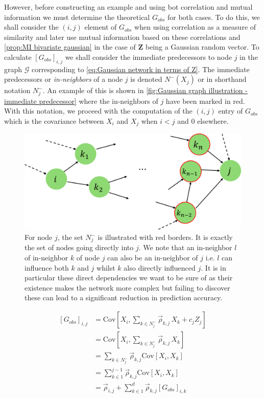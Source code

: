 \documentclass[../Thesis.tex]{subfiles}
\begin{document}
However, before constructing an example and using bot correlation and mutual information we must determine the theoretical $G_{obs}$ for both cases. To do this, we shall consider the $(i,j)$ element of $G_{obs}$ when using correlation as a measure of similarity and later use mutual information based on these correlations and \autoref{prop:MI bivariate gaussian} in the case of $\boldsymbol Z$ being a Gaussian random vector. To calculate $\left[G_{obs}\right]_{i,j}$ we shall consider the immediate predecessors to node $j$ in the graph $\mathcal{G}$ corresponding to \autoref{eq:Gaussian network in terms of Z}. The immediate predecessors or \textit{in-neighbors} of a node $j$ is denoted $N^-\left(X_j\right)$ or in shorthand notation $N^-_j$. An example of this is shown in \autoref{fig:Gaussian graph illustration - immediate predecessor} where the in-neighbors of $j$ have been marked in red. With this notation, we proceed with the computation of the $(i,j)$ entry of $G_{obs}$ which is the covariance between $X_i$ and $X_j$ when $i < j$ and $0$ elsewhere.
\begin{figure}[H]
    \centering
    \includegraphics[width = .7\linewidth]{figures/ND examples/Gaussian graph illustration - immediate predecessor.png}
    \caption{For node $j$, the set $N^-_j$ is illustrated with red borders. It is exactly the set of nodes going directly into $j$. We note that an in-neighbor $l$ of in-neighbor $k$ of node $j$ can also be an in-neighbor of $j$ i.e. $l$ can influence both $k$ and $j$ whilst $k$ also directly influenced $j$. It is in particular these direct dependencies we want to be sure of as their existence makes the network more complex but failing to discover these can lead to a significant reduction in prediction accuracy.}
    \label{fig:Gaussian graph illustration - immediate predecessor}
\end{figure}
\begin{equation}
    \begin{split}
        \left[G_{obs}\right]_{i,j} & = \text{Cov}\left[X_i , \sum_{k \in N^-_j} \vec{\rho}_{k,j} \, X_k + c_j Z_j\right] \\
                                   & = \text{Cov}\left[X_i , \sum_{k \in N^-_j} \vec{\rho}_{k,j} \, X_k\right]           \\
                                   & = \sum_{k \in N^-_j}\vec{\rho}_{k,j} \text{Cov}\left[X_i, X_k\right]                \\
                                   & = \sum_{k \in 1}^{j-1} \vec{\rho}_{k,j} \text{Cov}\left[X_i, X_k\right]             \\
                                   & = \vec{\rho}_{i,j} + \sum_{k \in 1}^{d} \vec{\rho}_{k,j} \left[G_{obs}\right]_{i,k}
    \end{split}
\end{equation}
\end{document}
